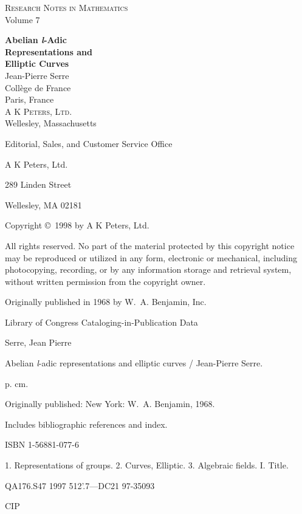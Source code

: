 \pagestyle{empty}
\chapcode{}%

\clearpage
\vspace*{\fill}
\begin{center}
  {\scshape Research Notes in Mathematics}\\[0.6\baselineskip]
  Volume 7
\end{center}
\vspace*{\fill}

\clearpage
\vspace*{2\baselineskip}
\begin{center}
  {\Large\bfseries Abelian \textit{l}-Adic\\[0.4\baselineskip] Representations and\\[0.4\baselineskip] Elliptic Curves}\\[2.5\baselineskip]
  {\large Jean-Pierre Serre}\\[1\baselineskip]
  Collège de France\\
  Paris, France\\[3\baselineskip]
  {\scshape A K Peters, Ltd.}\\
  Wellesley, Massachusetts
\end{center}
\vspace*{\fill}

\clearpage
\noindent
Editorial, Sales, and Customer Service Office

A K Peters, Ltd.

289 Linden Street

Wellesley, MA 02181

\medskip
Copyright \copyright\ 1998 by A K Peters, Ltd.

All rights reserved. No part of the material protected by this copyright
notice may be reproduced or utilized in any form, electronic or mechanical,
including photocopying, recording, or by any information storage and
retrieval system, without written permission from the copyright owner.

\medskip
Originally published in 1968 by W.~A. Benjamin, Inc.

\medskip
Library of Congress Cataloging-in-Publication Data

Serre, Jean Pierre

Abelian \textit{l}-adic representations and elliptic curves / Jean-Pierre Serre.

p. cm.

Originally published: New York: W.~A. Benjamin, 1968.

Includes bibliographic references and index.

ISBN 1-56881-077-6

1. Representations of groups.  2. Curves, Elliptic.  3. Algebraic fields.
I. Title.

QA176.S47 1997          512'.7---DC21          97-35093

CIP
\clearpage
